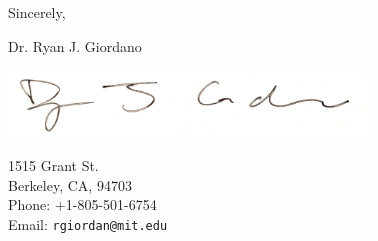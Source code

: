 \vspace{1em} Sincerely,

\begin{minipage}[t]{0.7\textwidth}
\vspace{1em} Dr. Ryan J. Giordano

\hspace{-1em}\includegraphics[height=0.7in]{static_images/sig.jpg}
\end{minipage}
\begin{minipage}[t]{0.3\textwidth}
    \vspace{1em}
    1515 Grant St.\\
    Berkeley, CA, 94703\\
    Phone: +1-805-501-6754\\
    Email: \texttt{rgiordan@mit.edu}\\
\end{minipage}


